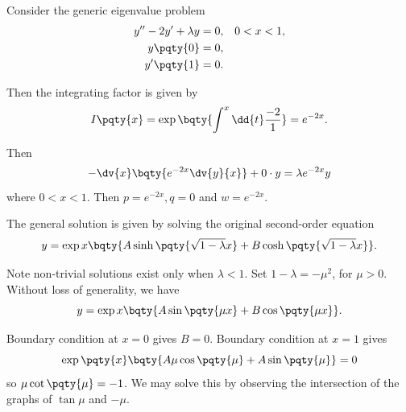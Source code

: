 \begin{example}
    Consider the generic eigenvalue problem
    \begin{equation}
        \begin{aligned}
            y'' - 2 y' + \lambda y &= 0, && 0 < x < 1, \\
            y\pqty{0} &= 0, \\
            y'\pqty{1} &= 0.
        \end{aligned}
    \end{equation}

    Then the integrating factor is given by
    \begin{equation}
        I \pqty{x} = \exp \bqty{\int^x \dd{t} \frac{-2}{1}} = e^{-2x}.
    \end{equation}

    Then
    \begin{equation}
        - \dv{x} \bqty{e^{-2x} \dv{y}{x}} + 0 \cdot y = \lambda e^{-2x} y
    \end{equation}
    where \(0 < x < 1\). Then \(p = e^{-2x}, q = 0\) and \(w = e^{-2x}\).

    The general solution is given by solving the original second-order equation
    \begin{equation}
        y = \exp x \bqty{A \sinh \pqty{\sqrt{1 - \lambda} x} + B \cosh \pqty{\sqrt{1 - \lambda} x}}.
    \end{equation}

    Note non-trivial solutions exist only when \(\lambda < 1\). Set \(1 - \lambda = - \mu^2\), for \(\mu > 0\). Without loss of generality, we have
    \begin{equation}
        y = \exp x \bqty{A \sin \pqty{\mu x} + B \cos \pqty{\mu x}}.
    \end{equation}

    Boundary condition at \(x = 0\) gives \(B = 0\). Boundary condition at \(x = 1\) gives
    \begin{equation}
        \exp \pqty{x} \bqty{A \mu \cos \pqty{\mu} + A \sin \pqty{\mu}} = 0
    \end{equation}
    so \(\mu \cot \pqty{\mu} = -1\). We may solve this by observing the intersection of the graphs of \(\tan \mu\) and \(- \mu\).


\end{example}
